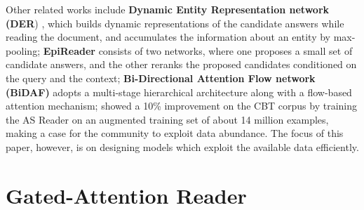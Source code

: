 \documentclass[11pt,a4paper]{article}
\begin{document}

Other related works include \textbf{Dynamic Entity Representation network (DER}) \citep{kobayashi2016dynamic},
which builds dynamic representations of the candidate answers while reading the document, and accumulates the information about an entity by max-pooling;
\textbf{EpiReader} \citep{trischler2016natural}
consists of two networks, where one proposes a small set of candidate answers, and the other reranks the proposed candidates conditioned on the query and the context; \textbf{Bi-Directional Attention Flow network (BiDAF)} \cite{seo2016bidirectional} adopts a multi-stage hierarchical architecture along with a flow-based attention mechanism;
\citet{bajgar2016embracing} showed a 10\% improvement on the CBT corpus \citep{hill2015goldilocks} by training the AS Reader on an augmented training set of about 14 million examples, making a case for the community to exploit data abundance. The focus of this paper, however, is on designing models which exploit the available data efficiently.

\section{Gated-Attention Reader}
\label{sec:ga}

\end{document}
